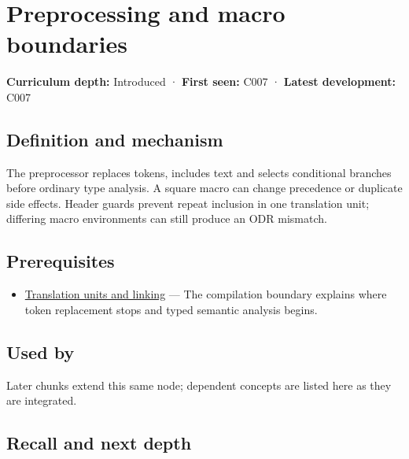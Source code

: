 \hypertarget{appendix-33c0a92ce855}{}\label{referencestart:appendix-33c0a92ce855}
\section{Preprocessing and macro boundaries}\label{appendix-33c0a92ce855-preprocessing-and-macro-boundaries}

\textbf{Curriculum depth:} Introduced · \textbf{First seen:} C007 · \textbf{Latest development:} C007

\begin{allmightroledefinition}

\subsection{Definition and mechanism}\label{appendix-33c0a92ce855-definition-and-mechanism}

The preprocessor replaces tokens, includes text and selects conditional branches before ordinary type analysis. A square macro can change precedence or duplicate side effects. Header guards prevent repeat inclusion in one translation unit; differing macro environments can still produce an ODR mismatch.

\end{allmightroledefinition}

\subsection{Prerequisites}\label{appendix-33c0a92ce855-prerequisites}

\begin{itemize}
\tightlist
\item
  \hyperref[appendix-806686359e1b]{Translation units and linking} --- The compilation boundary explains where token replacement stops and typed semantic analysis begins.
\end{itemize}

\subsection{Used by}\label{appendix-33c0a92ce855-used-by}

Later chunks extend this same node; dependent concepts are listed here as they are integrated.

\subsection{Recall and next depth}\label{appendix-33c0a92ce855-recall-and-next-depth}


